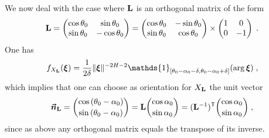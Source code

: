 \documentclass{elsarticle}
\begin{document}
\medskip

 We now deal with the case where $\mathbf{L}$ is an orthogonal matrix of the form 
\[
\mathbf{L}=\begin{pmatrix}\cos \theta_0&\sin \theta_0 \\ \sin \theta_0&-\cos \theta_0 \end{pmatrix}=\begin{pmatrix}\cos \theta_0&-\sin \theta_0 \\ \sin \theta_0&\cos \theta_0 \end{pmatrix}\times\begin{pmatrix}1&0 \\ 0&-1 \end{pmatrix}\;.
\] 
One has 
\[
f_{X_{\mat{L}}}(\vect{\xi})=\frac{1}{2\delta} \lVert \vect{\xi}\rVert^{-2H-2}\mathds{1}_{[\theta_0-\alpha_0-\delta,\theta_0-\alpha_0+\delta]}(\mathrm{arg}\, \vect{\xi} )\;,
\]
which implies that one can choose as orientation for $X_{\mathbf{L}}$ the unit vector
\begin{equation}\label{e:orth2}
\bm{\vec n}_{\mathbf{L}}=\binom{\cos \left(\theta_0-\alpha_0\right)}{\sin \left(\theta_0-\alpha_0\right)}=\mathbf{L}\binom{\cos \alpha_0}{\sin \alpha_0}=(\mathbf{L}^{-1})^{\mathsf{T}} \binom{\cos \alpha_0}{\sin \alpha_0}\;,
\end{equation}
since as above any orthogonal matrix equals the transpose of its inverse.
\medskip
\end{document}
